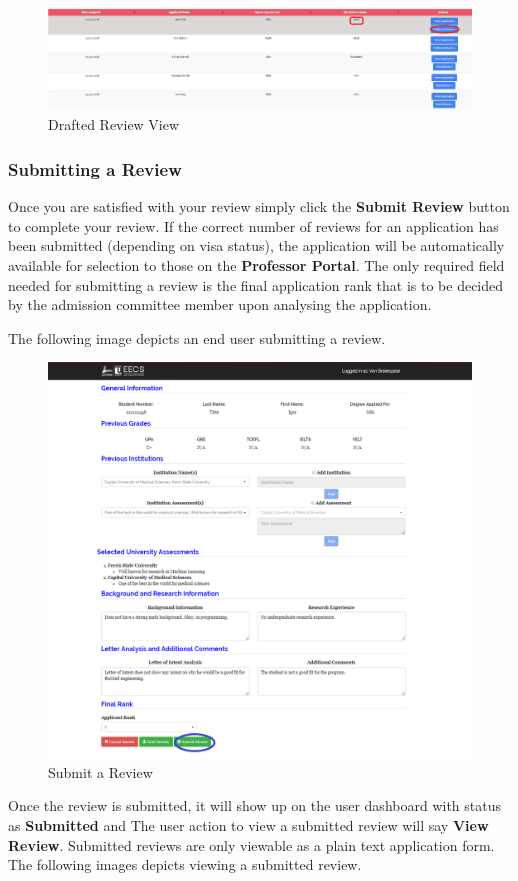 \documentclass[fontsize=12pt,paper=letter,twoside]{scrartcl}
\begin{document}
\begin{figure}[!htb]
\begin{center}
\includegraphics[width=.9\textwidth]{images/cm/drafted_review.png}
\end{center}
\caption{Drafted Review View}
\label{fig:cm:drafted_review}
\end{figure}

\clearpage
\subsubsection{Submitting a Review}
Once you are satisfied with your review simply  click the \textbf{Submit Review} button to complete your review. If the correct number of reviews for an application has been submitted (depending on visa status), the application will be automatically available for selection to those on the \textbf{Professor Portal}. The only required field needed for submitting a review is the final application rank that is to be decided by the admission committee member upon analysing the application.

\bigskip
\noindent The following image depicts an end user submitting a review. 

\begin{figure}[!htb]
\begin{center}
\includegraphics[width=.8\textwidth]{images/cm/submit_review.png}
\end{center}
\caption{Submit a Review}
\label{fig:cm:submit_review}
\end{figure}
\clearpage
\bigskip
\noindent Once the review is submitted, it will show up on the user dashboard with status as \textbf{Submitted} and The user action to view a submitted review will say \textbf{View Review}. Submitted reviews are only viewable as a plain text application form. The following images depicts viewing a submitted review.
\end{document}
